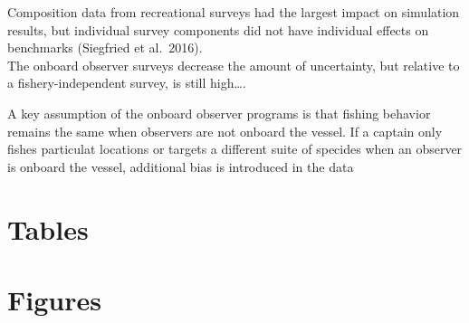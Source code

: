 \documentclass[preprint, 3p,
authoryear]{elsarticle} %
\begin{document}
Composition data from recreational surveys had the largest impact on
simulation results, but individual survey components did not have
individual effects on benchmarks (Siegfried et al.~2016).\\
The onboard observer surveys decrease the amount of uncertainty, but
relative to a fishery-independent survey, is still high\ldots.

A key assumption of the onboard observer programs is that fishing
behavior remains the same when observers are not onboard the vessel. If
a captain only fishes particulat locations or targets a different suite
of specides when an observer is onboard the vessel, additional bias is
introduced in the data

\hypertarget{tables}{%
\section{Tables}\label{tables}}

\hypertarget{figures}{%
\section{Figures}\label{figures}}

\renewcommand\refname{References}

\end{document}
